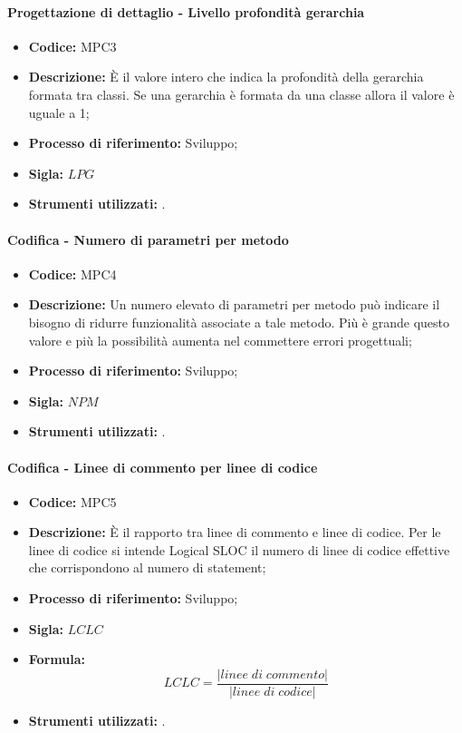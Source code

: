 \paragraph{Progettazione di dettaglio - Livello profondità gerarchia}
    \begin{itemize}
        \item \textbf{Codice:} MPC3
        \item \textbf{Descrizione:} È il valore intero che indica la profondità della gerarchia formata tra classi. Se una gerarchia è formata da una classe allora il valore è uguale a 1;
        \item \textbf{Processo di riferimento:} Sviluppo;
        \item \textbf{Sigla:} $LPG$
        \item \textbf{Strumenti utilizzati:} .
    \end{itemize}

\paragraph{Codifica - Numero di parametri per metodo}
    \begin{itemize}
        \item \textbf{Codice:} MPC4
        \item \textbf{Descrizione:} Un numero elevato di parametri per metodo può indicare il bisogno di ridurre funzionalità associate a tale metodo. Più è grande questo valore e più la possibilità aumenta nel commettere errori progettuali;
        \item \textbf{Processo di riferimento:} Sviluppo;
        \item \textbf{Sigla:} $NPM$
        \item \textbf{Strumenti utilizzati:} .
    \end{itemize}

\paragraph{Codifica - Linee di commento per linee di codice}
    \begin{itemize}
        \item \textbf{Codice:} MPC5
        \item \textbf{Descrizione:} È il rapporto tra linee di commento e linee di codice. Per le linee di codice si intende Logical SLOC il numero di linee di codice effettive che corrispondono al numero di statement;
        \item \textbf{Processo di riferimento:} Sviluppo;
        \item \textbf{Sigla:} $LCLC$
        \item \textbf{Formula:}$$LCLC = \frac{|linee \; di \; commento|}{|linee \; di \; codice|}$$
        \item \textbf{Strumenti utilizzati:} .
    \end{itemize}
    
